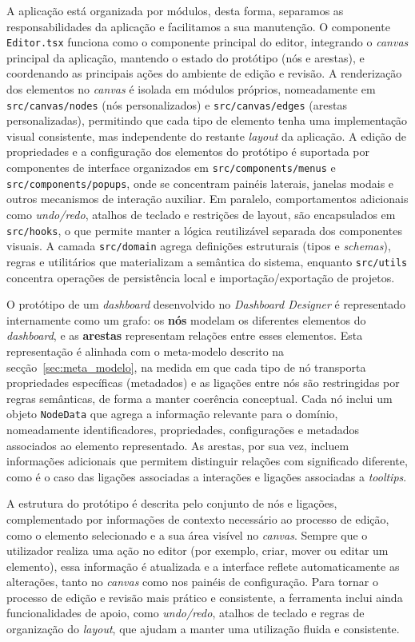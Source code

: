 A aplicação está organizada por módulos, desta forma, separamos as responsabilidades da aplicação e facilitamos a sua manutenção. O componente \texttt{Editor.tsx} funciona como o componente principal do editor, integrando o \textit{canvas} principal da aplicação, mantendo o estado do protótipo (nós e arestas), e coordenando as principais ações do ambiente de edição e revisão. A renderização dos elementos no \textit{canvas} é isolada em módulos próprios, nomeadamente em \texttt{src/canvas/nodes} (nós personalizados) e \texttt{src/canvas/edges} (arestas personalizadas), permitindo que cada tipo de elemento tenha uma implementação visual consistente, mas independente do restante \textit{layout} da aplicação. A edição de propriedades e a configuração dos elementos do protótipo é suportada por componentes de interface organizados em \texttt{src/components/menus} e \texttt{src/components/popups}, onde se concentram painéis laterais, janelas modais e outros mecanismos de interação auxiliar. Em paralelo, comportamentos adicionais como \textit{undo/redo}, atalhos de teclado e restrições de layout, são encapsulados em \texttt{src/hooks}, o que permite manter a lógica reutilizável separada dos componentes visuais. A camada \texttt{src/domain} agrega definições estruturais (tipos e \textit{schemas}), regras e utilitários que materializam a semântica do sistema, enquanto \texttt{src/utils} concentra operações de persistência local e importação/exportação de projetos.

O protótipo de um \textit{dashboard} desenvolvido no \textit{Dashboard Designer} é representado internamente como um grafo: os \textbf{nós} modelam os diferentes elementos do \textit{dashboard}, e as \textbf{arestas} representam relações entre esses elementos. Esta representação é alinhada com o meta-modelo descrito na secção~\ref{sec:meta_modelo}, na medida em que cada tipo de nó transporta propriedades específicas (metadados) e as ligações entre nós são restringidas por regras semânticas, de forma a manter coerência conceptual. Cada nó inclui um objeto \texttt{NodeData} que agrega a informação relevante para o domínio, nomeadamente identificadores, propriedades, configurações e metadados associados ao elemento representado. As arestas, por sua vez, incluem informações adicionais que permitem distinguir relações com significado diferente, como é o caso das ligações associadas a interações e ligações associadas a \textit{tooltips}.

A estrutura do protótipo é descrita pelo conjunto de nós e ligações, complementado por informações de contexto necessário ao processo de edição, como o elemento selecionado e a sua área visível no \textit{canvas}. Sempre que o utilizador realiza uma ação no editor (por exemplo, criar, mover ou editar um elemento), essa informação é atualizada e a interface reflete automaticamente as alterações, tanto no \textit{canvas} como nos painéis de configuração. Para tornar o processo de edição e revisão mais prático e consistente, a ferramenta inclui ainda funcionalidades de apoio, como \textit{undo/redo}, atalhos de teclado e regras de organização do \textit{layout}, que ajudam a manter uma utilização fluida e consistente.

